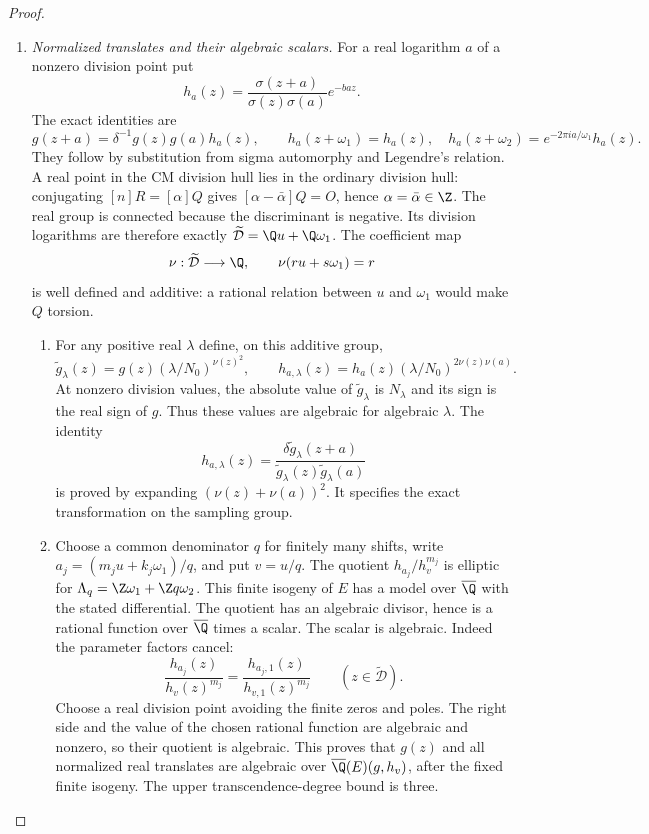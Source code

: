\begin{proof}
\begin{enumerate}[label=\arabic*.,leftmargin=0pt,labelsep=.5em]
\item \emph{Normalized translates and their algebraic scalars.}
For a real logarithm $a$ of a nonzero division point put
\[
 h_a(z)=\frac{\sigma(z+a)}{\sigma(z)\sigma(a)}e^{-baz}.
\]
The exact identities are
\[
 g(z+a)=\delta^{-1}g(z)g(a)h_a(z),\qquad
 h_a(z+\omega_1)=h_a(z),\quad
 h_a(z+\omega_2)=e^{-2\pi ia/\omega_1}h_a(z).
\]
They follow by substitution from sigma automorphy and Legendre's
relation. A real point in the CM division hull lies in the
ordinary division hull: conjugating $[n]R=[\alpha]Q$ gives
$[\alpha-\bar\alpha]Q=O$, hence $\alpha=\bar\alpha\in\Z$.
The real group is connected because the discriminant is negative.
Its division logarithms are therefore exactly
$\widetilde{\mathcal D}=\Q u+\Q\omega_1$.
The coefficient map
\[
 \nu:\widetilde{\mathcal D}\longrightarrow\Q,
 \qquad \nu(ru+s\omega_1)=r
\]
is well defined and additive: a rational relation between $u$
and $\omega_1$ would make $Q$ torsion.


\begin{enumerate}[label={$\langle2\rangle$\arabic*.},leftmargin=1.3em,labelsep=.5em]
\item  For any positive real $\lambda$ define, on this additive group,
\[
 \widetilde g_\lambda(z)
   =g(z)(\lambda/N_0)^{\nu(z)^2},\qquad
 h_{a,\lambda}(z)
   =h_a(z)(\lambda/N_0)^{2\nu(z)\nu(a)}.
\]
At nonzero division values, the absolute value of
$\widetilde g_\lambda$ is $N_\lambda$ and its sign is the real
sign of $g$. Thus these values are algebraic for algebraic
$\lambda$. The identity
\[
 h_{a,\lambda}(z)=
 \frac{\delta\widetilde g_\lambda(z+a)}
      {\widetilde g_\lambda(z)\widetilde g_\lambda(a)}
\]
is proved by expanding $(\nu(z)+\nu(a))^2$.
It specifies the exact transformation on the sampling group.


\item  Choose a common denominator $q$ for finitely many shifts,
write $a_j=(m_ju+k_j\omega_1)/q$, and put $v=u/q$.
The quotient $h_{a_j}/h_v^{m_j}$ is elliptic for
$\Lambda_q=\Z\omega_1+\Z q\omega_2$. This finite isogeny
of $E$ has a model over $\overline\Q$ with the stated
differential. The quotient has an algebraic divisor, hence
is a rational function over $\overline\Q$ times a scalar.
The scalar is algebraic. Indeed the parameter factors cancel:
\[
 \frac{h_{a_j}(z)}{h_v(z)^{m_j}}
  =\frac{h_{a_j,1}(z)}{h_{v,1}(z)^{m_j}}
       \qquad(z\in\widetilde{\mathcal D}).
\]
Choose a real division point avoiding the finite zeros and poles.
The right side and the value of the chosen rational function
are algebraic and nonzero, so their quotient is algebraic.
This proves that $g(z)$ and all normalized real translates are
algebraic over $\overline\Q(E)(g,h_v)$, after the fixed finite
isogeny. The upper transcendence-degree bound is three.



\end{enumerate}
\end{enumerate}
\end{proof}
